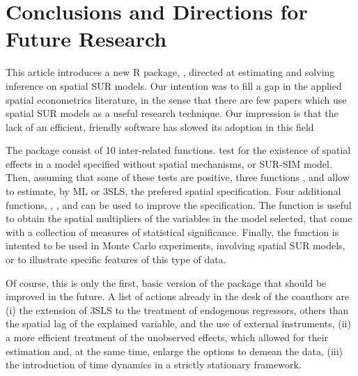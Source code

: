 \documentclass[article]{jss}
\begin{document}
\hypertarget{conclusions-and-directions-for-future-research}{%
\section{Conclusions and Directions for Future Research}\label{conclusions-and-directions-for-future-research}}

This article introduces a new R package, , directed at estimating and solving inference on spatial SUR models. Our intention was to fill a gap in the applied spatial econometrics literature, in the sense that there are few papers which use spatial SUR models as a useful research technique. Our impression is that the lack of an efficient, friendly software has slowed its adoption in this field

The package consist of 10 inter-related functions.  test for the existence of spatial effects in a model specified without spatial mechanisms, or SUR-SIM model. Then, assuming that some of these tests are positive, three functions ,  and  allow to estimate, by ML or 3SLS, the prefered spatial specification. Four additional functions, , ,  and  can be used to improve the specification. The function  is useful to obtain the spatial multipliers of the variables in the model selected, that come with a collection of measures of statistical significance. Finally, the function  is intented to be used in Monte Carlo experiments, involving spatial SUR models, or to illustrate specific features of this type of data.

Of course, this is only the first, basic version of the package that should be improved in the future. A list of actions already in the desk of the coauthors are (i) the extension of 3SLS to the treatment of endogenous regressors, others than the spatial lag of the explained variable, and the use of external instruments, (ii) a more efficient treatment of the unobserved effects, which allowed for their estimation and, at the same time, enlarge the options to demean the data, (iii) the introduction of time dynamics in a strictly stationary framework.

\renewcommand\refname{References}

\end{document}
